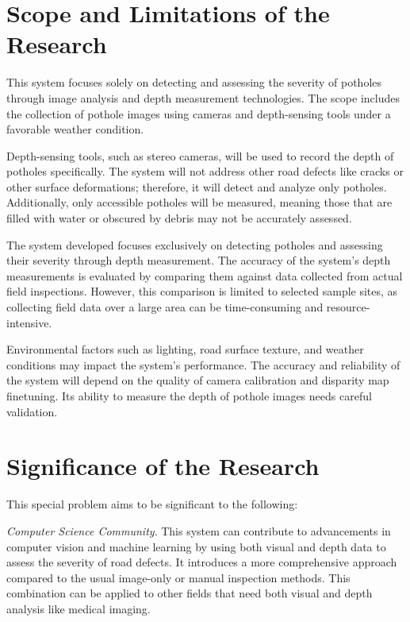 \section{Scope and Limitations of the Research}
\label{sec:scopelimitations}

This system focuses solely on detecting and assessing the severity of potholes through image analysis and depth measurement technologies. The scope includes the collection of pothole images using cameras and depth-sensing tools under a favorable weather condition.

Depth-sensing tools, such as stereo cameras, will be used to record the depth of potholes specifically. The system will not address other road defects like cracks or other surface deformations; therefore, it will detect and analyze only potholes. Additionally, only accessible potholes will be measured, meaning those that are filled with water or obscured by debris may not be accurately assessed.

The system developed focuses exclusively on detecting potholes and assessing their severity through depth measurement. The accuracy of the system’s depth measurements is evaluated by comparing them against data collected from actual field inspections. However, this comparison is limited to selected sample sites, as collecting field data over a large area can be time-consuming and resource-intensive.

Environmental factors such as lighting, road surface texture, and weather conditions may impact the system's performance. The accuracy and reliability of the system will depend on the quality of camera calibration and disparity map finetuning. Its ability to measure the depth of pothole images needs careful validation.


\section{Significance of the Research}
\label{sec:significance}

This special problem aims to be significant to the following:


\textit{Computer Science Community}. This system can contribute to advancements in computer vision and machine learning by using both visual and depth data to assess the severity of road defects. It introduces a more comprehensive approach compared to the usual image-only or manual inspection methods. This combination can be applied to other fields that need both visual and depth analysis like medical imaging. 


